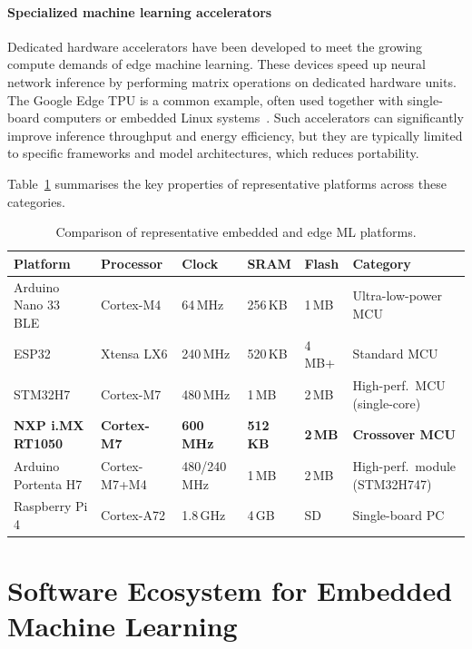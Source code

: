 \paragraph{Specialized machine learning accelerators}

Dedicated hardware accelerators have been developed to meet the growing compute demands of edge machine learning. These devices speed up neural network inference by performing matrix operations on dedicated hardware units. The Google Edge TPU is a common example, often used together with single-board computers or embedded Linux systems~\cite{edgetpu}. Such accelerators can significantly improve inference throughput and energy efficiency, but they are typically limited to specific frameworks and model architectures, which reduces portability.

Table~\ref{tab:platform_comparison} summarises the key properties of representative platforms across these categories.

\begin{table}[ht]
  \centering
  \caption{Comparison of representative embedded and edge ML platforms.}
  \label{tab:platform_comparison}
  \small
  \begin{tabular}{p{3.0cm}p{2.4cm}p{1.5cm}p{1.6cm}p{1.5cm}p{2.8cm}}
    \toprule
    \textbf{Platform} & \textbf{Processor} & \textbf{Clock} &
    \textbf{SRAM} & \textbf{Flash} & \textbf{Category} \\
    \midrule
    Arduino Nano 33 BLE & Cortex-M4    & 64\,MHz  & 256\,KB  & 1\,MB  & Ultra-low-power MCU \\
    ESP32               & Xtensa LX6   & 240\,MHz & 520\,KB  & 4\,MB+ & Standard MCU \\
    STM32H7             & Cortex-M7    & 480\,MHz & 1\,MB    & 2\,MB  & High-perf.\ MCU (single-core)\\
    \textbf{NXP i.MX RT1050} & \textbf{Cortex-M7} & \textbf{600\,MHz} &
      \textbf{512\,KB} & \textbf{2\,MB} & \textbf{Crossover MCU} \\
    Arduino Portenta H7 & Cortex-M7+M4    & 480/240 \,MHz & 1\,MB    & 2\,MB  & High-perf.\ module (STM32H747) \\
    Raspberry Pi 4      & Cortex-A72   & 1.8\,GHz & 4\,GB    & SD     & Single-board PC \\
    \bottomrule
  \end{tabular}
\end{table}


\section{Software Ecosystem for Embedded Machine Learning}
